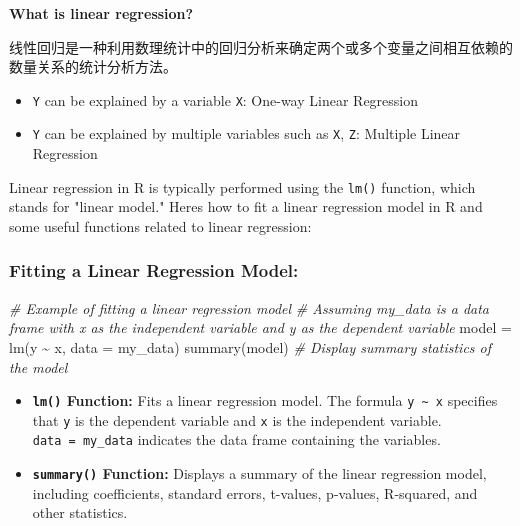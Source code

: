 \documentclass[
]{article}
\newenvironment{Shaded}{}{}
\newcommand{\AttributeTok}[1]{\textcolor[rgb]{0.49,0.56,0.16}{#1}}
\newcommand{\CommentTok}[1]{\textcolor[rgb]{0.38,0.63,0.69}{\textit{#1}}}
\newcommand{\FunctionTok}[1]{\textcolor[rgb]{0.02,0.16,0.49}{#1}}
\newcommand{\NormalTok}[1]{#1}
\newcommand{\OtherTok}[1]{\textcolor[rgb]{0.00,0.44,0.13}{#1}}
\newcommand{\SpecialCharTok}[1]{\textcolor[rgb]{0.25,0.44,0.63}{#1}}
\begin{document}
\textbf{What is linear regression?}

线性回归是一种利用数理统计中的回归分析来确定两个或多个变量之间相互依赖的数量关系的统计分析方法。

\begin{itemize}
\item
  \texttt{Y} can be explained by a variable \texttt{X}: One-way Linear
  Regression
\item
  \texttt{Y} can be explained by multiple variables such as \texttt{X},
  \texttt{Z}: Multiple Linear Regression
\end{itemize}

Linear regression in R is typically performed using the \texttt{lm()}
function, which stands for "linear model." Here\textquotesingle s how to
fit a linear regression model in R and some useful functions related to
linear regression:

\hypertarget{fitting-a-linear-regression-model}{%
\subsubsection{Fitting a Linear Regression
Model:}\label{fitting-a-linear-regression-model}}

\begin{Shaded}
\begin{Highlighting}[]
\CommentTok{\# Example of fitting a linear regression model}
\CommentTok{\# Assuming \textquotesingle{}my\_data\textquotesingle{} is a data frame with \textquotesingle{}x\textquotesingle{} as the independent variable and \textquotesingle{}y\textquotesingle{} as the dependent variable}
\NormalTok{model }\OtherTok{=} \FunctionTok{lm}\NormalTok{(y }\SpecialCharTok{\textasciitilde{}}\NormalTok{ x, }\AttributeTok{data =}\NormalTok{ my\_data)}
\FunctionTok{summary}\NormalTok{(model)  }\CommentTok{\# Display summary statistics of the model}
\end{Highlighting}
\end{Shaded}

\begin{itemize}
\item
  \textbf{\texttt{lm()} Function:} Fits a linear regression model. The
  formula \texttt{y\ \textasciitilde{}\ x} specifies that \texttt{y} is
  the dependent variable and \texttt{x} is the independent variable.
  \texttt{data\ =\ my\_data} indicates the data frame containing the
  variables.
\item
  \textbf{\texttt{summary()} Function:} Displays a summary of the linear
  regression model, including coefficients, standard errors, t-values,
  p-values, R-squared, and other statistics.
\end{itemize}
\end{document}
